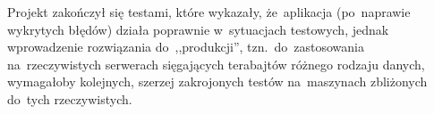 \documentclass[thesis]{subfiles}
\begin{document}
%
Projekt zakończył się testami, które wykazały, że~aplikacja (po~naprawie wykrytych błędów) działa poprawnie w~sytuacjach testowych, jednak wprowadzenie rozwiązania do~,,produkcji'', tzn.~do~zastosowania na~rzeczywistych serwerach sięgających terabajtów różnego rodzaju danych, wymagałoby kolejnych, szerzej zakrojonych testów na~maszynach zbliżonych do~tych rzeczywistych.
\end{document}
